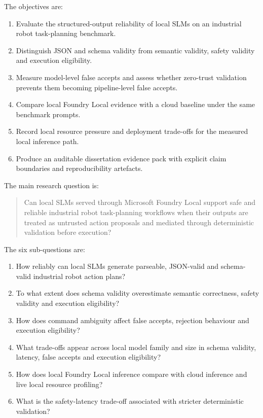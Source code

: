 \documentclass[sigconf,nonacm]{acmart}
\begin{document}
The objectives are:
\begin{enumerate}
    \item Evaluate the structured-output reliability of local SLMs on an industrial robot task-planning benchmark.
    \item Distinguish JSON and schema validity from semantic validity, safety validity and execution eligibility.
    \item Measure model-level false accepts and assess whether zero-trust validation prevents them becoming pipeline-level false accepts.
    \item Compare local Foundry Local evidence with a cloud baseline under the same benchmark prompts.
    \item Record local resource pressure and deployment trade-offs for the measured local inference path.
    \item Produce an auditable dissertation evidence pack with explicit claim boundaries and reproducibility artefacts.
\end{enumerate}

The main research question is:

\begin{quote}
Can local SLMs served through Microsoft Foundry Local support safe and reliable industrial robot task-planning workflows when their outputs are treated as untrusted action proposals and mediated through deterministic validation before execution?
\end{quote}

The six sub-questions are:
\begin{enumerate}
    \item How reliably can local SLMs generate parseable, JSON-valid and schema-valid industrial robot action plans?
    \item To what extent does schema validity overestimate semantic correctness, safety validity and execution eligibility?
    \item How does command ambiguity affect false accepts, rejection behaviour and execution eligibility?
    \item What trade-offs appear across local model family and size in schema validity, latency, false accepts and execution eligibility?
    \item How does local Foundry Local inference compare with cloud inference and live local resource profiling?
    \item What is the safety-latency trade-off associated with stricter deterministic validation?
\end{enumerate}
\end{document}
